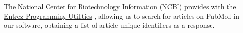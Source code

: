 The National Center for Biotechnology Information (NCBI) provides with the
\href{http://www.ncbi.nlm.nih.gov/books/NBK25501/}{Entrez Programming Utilities}
\cite{nationalcenterforbiotechnologyinformation2012},
allowing us to search for articles on PubMed in our software, obtaining a list of article
unique identifiers as a response.
